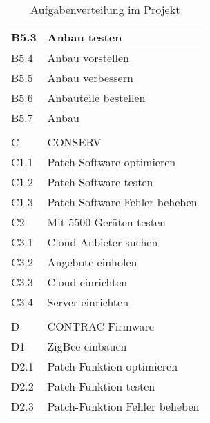 \begin{table}[H]
\begin{center}
\begin{tabular}{l|l}
            B5.3 & Anbau testen                                        \\ \hline
            B5.4 & Anbau vorstellen                                    \\ \hline
            B5.5 & Anbau verbessern                                    \\ \hline
            B5.6 & Anbauteile bestellen                                \\ \hline
            B5.7 & Anbau                                               \\ \hline
            &                                                     \\ \hline
            C    & CONSERV                                             \\ \hline
            C1.1 & Patch-Software optimieren                           \\ \hline
            C1.2 & Patch-Software testen                               \\ \hline
            C1.3 & Patch-Software Fehler beheben                       \\ \hline
            C2   & Mit 5500 Geräten testen                             \\ \hline
            C3.1 & Cloud-Anbieter suchen                               \\ \hline
            C3.2 & Angebote einholen                                   \\ \hline
            C3.3 & Cloud einrichten                                    \\ \hline
            C3.4 & Server einrichten                                   \\ \hline
            &                                                     \\ \hline
            D    & CONTRAC-Firmware                                    \\ \hline
            D1   & ZigBee einbauen                                     \\ \hline
            D2.1 & Patch-Funktion optimieren                           \\ \hline
            D2.2 & Patch-Funktion testen                               \\ \hline
            D2.3 & Patch-Funktion Fehler beheben                       \\
        \end{tabular}
        \caption{Aufgabenverteilung im Projekt}
    \end{center}
\end{table}
